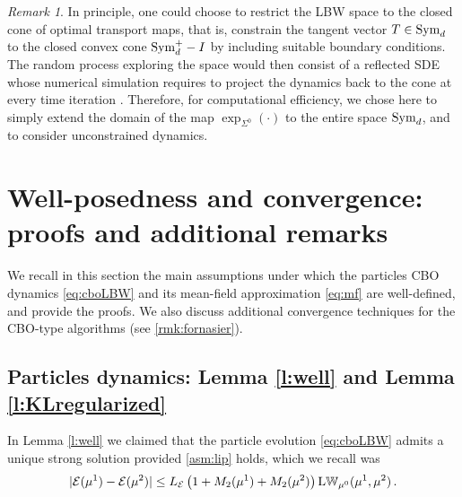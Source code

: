 \documentclass{article}
\theoremstyle{plain}
\theoremstyle{definition}
\theoremstyle{remark}
\newtheorem{remark}[theorem]{Remark}
\newcommand{\E}{\mathcal{E}}
\newcommand{\sym}{\textup{Sym}_d}
\newcommand{\psd}{\textup{Sym}^{+}_d}
\newcommand{\LW}{\textup{L}\mathbb{W}}
\begin{document}
\begin{remark}
In principle, one could choose to restrict the LBW space to the closed cone of optimal transport maps, that is, constrain the tangent vector $T \in \sym$ to the closed convex cone $\psd - I$ by including suitable  boundary conditions. The random process exploring the space would then consist of a reflected SDE \cite{pilipenko2014} 
whose numerical simulation requires to project the dynamics back to the cone at every time iteration \cite{pettersson2000}. Therefore, for computational efficiency, we chose here to simply extend the domain of the map $\exp_{\Sigma^0}(\cdot)$ to the entire space $\sym$,  and to consider unconstrained dynamics. 
\end{remark}


\section{Well-posedness and convergence: proofs and additional remarks}
\label{app:proofs}

We recall in this section the main assumptions under which the particles CBO dynamics \eqref{eq:cboLBW} and its mean-field approximation \eqref{eq:mf} are well-defined, and provide the proofs. We also discuss additional convergence techniques for the CBO-type algorithms (see \cref{rmk:fornasier}).

\subsection{Particles dynamics: Lemma \ref{l:well} and Lemma \ref{l:KLregularized}} \label{app:proofs:well}

In Lemma \ref{l:well} we claimed that the particle evolution \eqref{eq:cboLBW} admits a unique strong solution provided \eqref{asm:lip} holds, which we recall was 
\[
|\E(\mu^1) - \E(\mu^2)| \leq L_\E \left(1 + M_2(\mu^1) + M_2(\mu^2)\right)  \LW_{\mu^0}(\mu^1, \mu^2)\,.
\]
\end{document}
